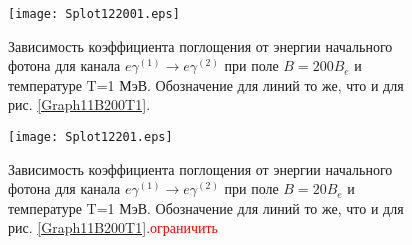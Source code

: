 \begin{figure}[t!]\centering
	\texttt{[image: Splot122001.eps]}
	\caption{Зависимость коэффициента поглощения от энергии начального фотона для канала $e\gamma^{(1)}\to e\gamma^{(2)}$ при поле $B=200 B_e$ и температуре T=1 МэВ. Обозначение для линий то же, что и для рис. \ref{Graph11B200T1}.}
	\label{Graph12B200T1}
\end{figure}

\begin{figure}[t!]\centering
	\texttt{[image: Splot12201.eps]}
	\caption{Зависимость коэффициента поглощения от энергии начального фотона для канала $e\gamma^{(1)}\to e\gamma^{(2)}$ при поле $B=20 B_e$ и температуре T=1 МэВ. Обозначение для линий то же, что и для рис. \ref{Graph11B200T1}.\textcolor{red}{ограничить}}
	\label{Graph12B20T1}
\end{figure}
\clearpage
